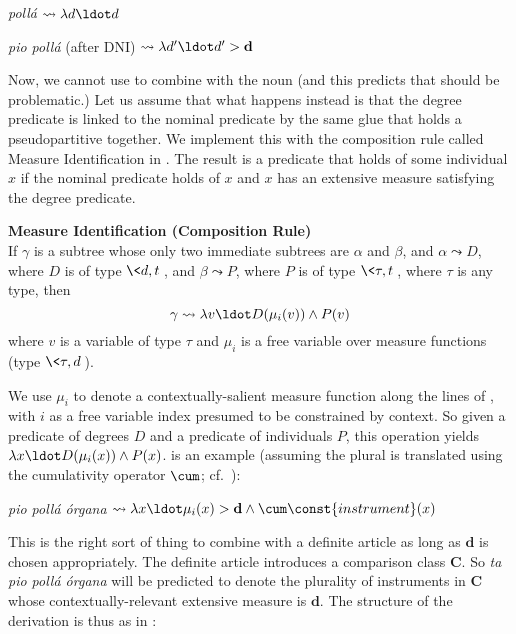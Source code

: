 \documentclass[output=paper
,modfonts
,nonflat]{langsci/langscibook}
\begin{document}
\ea \label{ex:coppockstrand:96} 
\textit{pollá} $\leadsto \lambda d \ldot d$ 
\z 

\ea \label{ex:coppockstrand:97}
\textit{pio pollá} (after DNI) $\leadsto \lambda d' \ldot d' > \textbf{d}$ 
\z 

Now, we cannot use  to combine with the noun (and this predicts that  should be problematic.) Let us assume that what happens instead is that the degree predicate is linked to the nominal predicate by the same glue that holds a pseudopartitive together. We implement this with the composition rule called Measure Identification in . The result is a predicate that holds of some individual $x$ if the nominal predicate holds of $x$ and $x$ has an extensive measure satisfying the degree predicate. 

\ea \label{ex:coppockstrand:98}
\textbf{Measure Identification (Composition Rule)}\\
If $\gamma$ is a subtree whose only two immediate subtrees are $\alpha$ and $\beta$, and $\alpha\leadsto D$, where $D$ is of type $\<d,t\>$, and $\beta\leadsto P$, where $P$ is of type $\<\tau,t\>$, where $\tau$ is any type, then $$\gamma\leadsto \lambda v \ldot D(\mu_i(v)) \land P(v)$$ where $v$ is a variable of type $\tau$ and $\mu_i$ is a free variable over measure functions (type $\<\tau,d\>$).
\z \newpage

We use $\mu_i$ to denote a contextually-salient measure function along the lines of \citet{Wellwood2014}, with $i$ as a free variable index presumed to be constrained by context. So given a predicate of degrees $D$ and a predicate of individuals $P$, this operation yields $\lambda x \ldot D(\mu_i(x)) \land P(x)$. 
 is an example (assuming the plural is translated using the cumulativity operator $\cum$; cf.\ \citealt{Link1983}):

\ea \label{ex:coppockstrand:99}
\textit{pio pollá órgana} $\leadsto \lambda x \ldot \mu_i(x) > \textbf{d} \land \cum\const{instrument}(x)$ 
\z 

This is the right sort of thing to combine with a definite article as long as $\textbf{d}$ is chosen appropriately. The definite article introduces a comparison class $\textbf{C}$. So \textit{ta pio pollá órgana} will be predicted to denote the plurality of instruments in $\textbf{C}$ whose contextually-relevant extensive measure is $\textbf{d}$. The structure of the derivation is thus as in :
\end{document}
